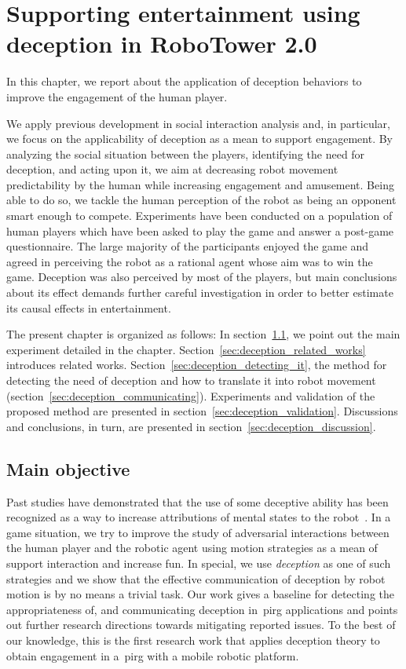 \chapter{Supporting entertainment using deception in RoboTower 2.0}\label{ch:deception}

In this chapter, we report about the application of deception behaviors to improve the engagement of the human player.

We apply previous development in social interaction analysis and, in particular, we focus on the applicability of deception as a mean to support engagement. By analyzing the social situation between the players, identifying the need for deception, and acting upon it, we aim at decreasing robot movement predictability by the human while increasing engagement and amusement. Being able to do so, we tackle the human perception of the robot as being an opponent smart enough to compete. Experiments have been conducted on a population of human players which have been asked to play the game and answer a post-game questionnaire. The large majority of the participants enjoyed the game and agreed in perceiving the robot as a rational agent whose aim was to win the game. Deception was also perceived by most of the players, but main conclusions about its effect demands further careful investigation in order to better estimate its causal effects in entertainment.

The present chapter is organized as follows: In section~\ref{sec:deception_main_objectives}, we point out the main experiment detailed in the chapter. Section~\ref{sec:deception_related_works} introduces related works. Section~\ref{sec:deception_detecting_it}, the method for detecting the need of deception and how to translate it into robot movement (section~\ref{sec:deception_communicating}).
Experiments and validation of the proposed method are presented in section~\ref{sec:deception_validation}. Discussions and conclusions, in turn, are presented in section~\ref{sec:deception_discussion}.

\section{Main objective} \label{sec:deception_main_objectives}

Past studies have demonstrated that the use of some deceptive ability has been recognized as a way to increase attributions of mental states to the robot~\citep{shim_taxonomy_2013}. In a game situation, we try to improve the study of adversarial interactions between the human player and the robotic agent using motion strategies as a mean of support interaction and increase fun. In special, we use \textit{deception} as one of such strategies and we show that the effective communication of deception by robot motion is by no means a trivial task. Our work gives a baseline for detecting the appropriateness of, and communicating deception in~\gls{pirg} applications and points out further research directions towards mitigating reported issues. To the best of our knowledge, this is the first research work that applies deception theory to obtain engagement in a~\gls{pirg} with a mobile robotic platform.

